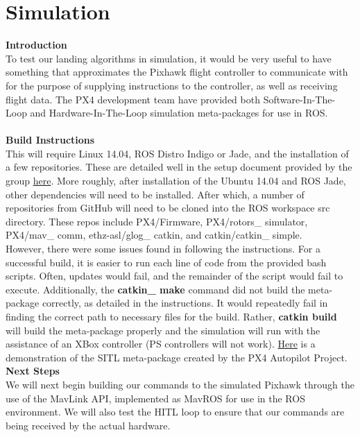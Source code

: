 \documentclass[11pt]{book}
\begin{document}
\section*{Simulation}
\large{\textbf{Introduction}}\\
\normalsize
\noindent To test our landing algorithms in simulation, it would be very useful to have something that approximates the Pixhawk flight controller to communicate with for the purpose of supplying instructions to the controller, as well as receiving flight data. The PX4 development team have provided both Software-In-The-Loop and Hardware-In-The-Loop simulation meta-packages for use in ROS.\\
\vspace{2mm}\\
\large{\textbf{Build Instructions}}\\
\normalsize
\noindent This will require Linux 14.04, ROS Distro Indigo or Jade, and the installation of a few repositories. These are detailed well in the setup document provided by the group \href{https://pixhawk.org/dev/ros/sitl#px4_ros_sitl_setup}{here}. More roughly, after installation of the Ubuntu 14.04 and ROS Jade, other dependencies will need to be installed. After which, a number of repositories from GitHub will need to be cloned into the ROS workspace src directory. These repos include PX4/Firmware, PX4/rotors\_ simulator, PX4/mav\_ comm, ethz-asl/glog\_ catkin, and catkin/catkin\_ simple. \\
\noindent However, there were some issues found in following the instructions. For a successful build, it is easier to run each line of code from the provided bash scripts. Often, updates would fail, and the remainder of the script would fail to execute. Additionally, the \textbf{catkin\_ make} command did not build the meta-package correctly, as detailed in the instructions. It would repeatedly fail in finding the correct path to necessary files for the build. Rather, \textbf{catkin build} will build the meta-package properly and the simulation will run with the assistance of an XBox controller (PS controllers will not work). \href{https://www.youtube.com/watch?v=qfFF9-0k4KA}{Here} is a demonstration of the SITL meta-package created by the PX4 Autopilot Project.\\ 

\vspace{2mm}
\noindent\large{\textbf{Next Steps}}\\	
\normalsize	
\noindent We will next begin building our commands to the simulated Pixhawk through the use of the MavLink API, implemented as MavROS for use in the ROS environment. We will also test the HITL loop to ensure that our commands are being received by the actual hardware. 
\end{document}
